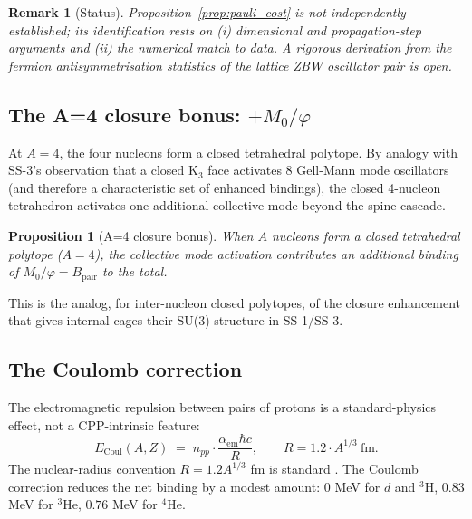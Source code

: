 \documentclass[11pt,letterpaper]{article}
\newtheorem{proposition}[theorem]{Proposition}
\newtheorem{remark}[theorem]{Remark}
\newcommand{\phig}{\varphi}
\newcommand{\Mzero}{M_0}
\newcommand{\Bpair}{B_{\mathrm{pair}}}
\newcommand{\npp}{n_{pp}}
\begin{document}
\begin{remark}[Status]
Proposition~\ref{prop:pauli_cost} is not independently established; its identification rests on (i) dimensional and propagation-step arguments and (ii) the numerical match to data. A rigorous derivation from the fermion antisymmetrisation statistics of the lattice ZBW oscillator pair is open.
\end{remark}

\subsection{The A=4 closure bonus: $+\Mzero/\phig$}
\label{sec:closure}

At $A = 4$, the four nucleons form a closed tetrahedral polytope. By analogy with SS-3's observation that a closed K$_3$ face activates 8 Gell-Mann mode oscillators (and therefore a characteristic set of enhanced bindings), the closed 4-nucleon tetrahedron activates one additional collective mode beyond the spine cascade.

\begin{proposition}[A=4 closure bonus]
\label{prop:closure}
When $A$ nucleons form a closed tetrahedral polytope ($A = 4$), the collective mode activation contributes an additional binding of $\Mzero/\phig = \Bpair$ to the total.
\end{proposition}

This is the analog, for inter-nucleon closed polytopes, of the closure enhancement that gives internal cages their SU(3) structure in SS-1/SS-3.

\subsection{The Coulomb correction}
\label{sec:coulomb}

The electromagnetic repulsion between pairs of protons is a standard-physics effect, not a CPP-intrinsic feature:
\begin{equation}
E_{\mathrm{Coul}}(A, Z) \;=\; \npp \cdot \frac{\alpha_{\mathrm{em}} \hbar c}{R}, \qquad R = 1.2 \cdot A^{1/3}~\mathrm{fm}.
\label{eq:coulomb}
\end{equation}
The nuclear-radius convention $R = 1.2 A^{1/3}$ fm is standard \citep{krane_nuclear}. The Coulomb correction reduces the net binding by a modest amount: $0$ MeV for $d$ and ${}^{3}\mathrm{H}$, $0.83$ MeV for ${}^{3}\mathrm{He}$, $0.76$ MeV for ${}^{4}\mathrm{He}$.

\end{document}
